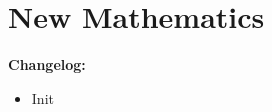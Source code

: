 \chapter{New Mathematics}
\setcounter{section}{0}

\textbf{Changelog:}\\
\begin{itemize}
	\item 	{} Init
\end{itemize}

\pagebreak
